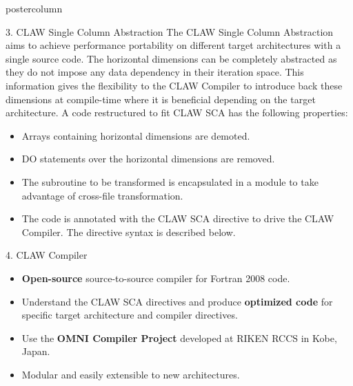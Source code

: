\documentclass{beamer}
\begin{document}
\begin{frame}
\begin{columns}
\begin{column}{.37\textwidth}
\begin{beamercolorbox}[center]{postercolumn}
\begin{minipage}{.98\textwidth}
{%
%
\begin{myblock}{3. CLAW Single Column Abstraction}
The CLAW Single Column Abstraction aims to achieve performance portability
on different target architectures with a single source code.
The horizontal dimensions can be completely abstracted as they do not impose
any data dependency in their iteration space.
This information gives the flexibility to the CLAW Compiler to introduce
back these dimensions at compile-time where it is beneficial depending on the
target architecture.
A code restructured to fit CLAW SCA has the following properties:
\begin{itemize}
  \item Arrays containing horizontal dimensions are demoted.
  \item DO statements over the horizontal dimensions are removed.
  \item The subroutine to be transformed is encapsulated in a module to take
        advantage of cross-file transformation.
  \item The code is annotated with the CLAW SCA directive to drive the CLAW
        Compiler. The directive syntax is described below.
\end{itemize}
\clawa
\end{myblock}%


%
%
\begin{myblock}{4. CLAW Compiler}
\begin{itemize}
  \item \textbf{Open-source} source-to-source compiler for Fortran 2008 code.
  \item Understand the CLAW SCA directives and produce \textbf{optimized
        code} for specific target architecture and compiler directives.
  \item Use the \textbf{OMNI Compiler Project}\cite{Omni} developed at
        RIKEN RCCS in Kobe, Japan.
  \item Modular and easily extensible to new architectures.
\end{itemize}

\begin{figure}
\end{figure}
\end{myblock}}
\end{minipage}
\end{beamercolorbox}
\end{column}
\end{columns}
\end{frame}
\end{document}

